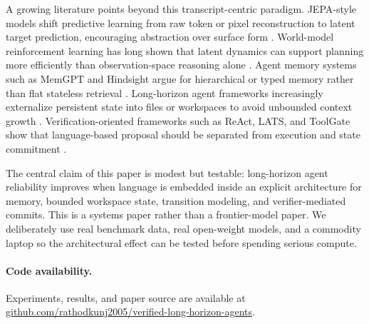 \documentclass[11pt]{article}
\begin{document}
A growing literature points beyond this transcript-centric paradigm. JEPA-style models shift predictive learning from raw token or pixel reconstruction to latent target prediction, encouraging abstraction over surface form \citep{vljepa2025, vjepa22025}. World-model reinforcement learning has long shown that latent dynamics can support planning more efficiently than observation-space reasoning alone \citep{planet2018, dreamerv32023}. Agent memory systems such as MemGPT and Hindsight argue for hierarchical or typed memory rather than flat stateless retrieval \citep{memgpt2023, hindsight2025}. Long-horizon agent frameworks increasingly externalize persistent state into files or workspaces to avoid unbounded context growth \citep{infiagent2026}. Verification-oriented frameworks such as ReAct, LATS, and ToolGate show that language-based proposal should be separated from execution and state commitment \citep{react2023, lats2023, toolgate2026}.

The central claim of this paper is modest but testable: long-horizon agent reliability improves when language is embedded inside an explicit architecture for memory, bounded workspace state, transition modeling, and verifier-mediated commits. This is a systems paper rather than a frontier-model paper. We deliberately use real benchmark data, real open-weight models, and a commodity laptop so the architectural effect can be tested before spending serious compute.

\paragraph{Code availability.} Experiments, results, and paper source are available at \href{https://github.com/rathodkunj2005/verified-long-horizon-agents}{github.com/rathodkunj2005/verified-long-horizon-agents}.
\end{document}
